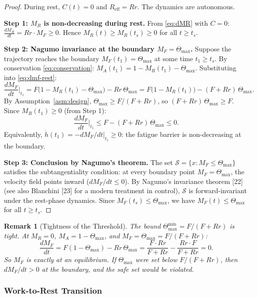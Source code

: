 \documentclass[11pt,a4paper]{article}
\newtheorem{remark}[theorem]{Remark}
\begin{document}
\begin{proof}
During rest, $C(t) = 0$ and $R_{\mathrm{eff}} = Rr$. The dynamics are
autonomous.

\textbf{Step 1: $M_R$ is non-decreasing during rest.} From
\eqref{eq:dMR} with $C = 0$:
$\frac{dM_R}{dt} = Rr \cdot M_F \geq 0$.
Hence $M_R(t) \geq M_R(t_s) \geq 0$ for all $t \geq t_s$.

\textbf{Step 2: Nagumo invariance at the boundary $M_F = \Theta_{\max}$.}
Suppose the trajectory reaches the boundary $M_F(t_1) = \Theta_{\max}$ at some
time $t_1 \geq t_s$. By conservation \eqref{eq:conservation}:
$M_A(t_1) = 1 - M_R(t_1) - \Theta_{\max}$.
Substituting into \eqref{eq:dmf-rest}:
\begin{equation}
\frac{dM_F}{dt}\bigg|_{t_1} = F\bigl(1 - M_R(t_1) - \Theta_{\max}\bigr) - Rr\,\Theta_{\max} = F\bigl(1 - M_R(t_1)\bigr) - (F + Rr)\,\Theta_{\max}.
\end{equation}
By Assumption~\ref{asm:design}, $\Theta_{\max} \geq F/(F + Rr)$, so
$(F + Rr)\,\Theta_{\max} \geq F$. Since $M_R(t_1) \geq 0$ (from Step 1):
\[
\frac{dM_F}{dt}\bigg|_{t_1} \leq F - (F + Rr)\,\Theta_{\max} \leq 0.
\]
Equivalently, $\dot h(t_1) = -dM_F/dt|_{t_1} \geq 0$: the fatigue
barrier is non-decreasing at the boundary.

\textbf{Step 3: Conclusion by Nagumo's theorem.} The set $\mathcal{S}
= \{x : M_F \leq \Theta_{\max}\}$ satisfies the subtangentiality
condition: at every boundary point $M_F = \Theta_{\max}$, the velocity
field points inward ($dM_F/dt \leq 0$). By Nagumo's invariance
theorem [22] (see also Blanchini [23] for a modern treatment in
control), $\mathcal{S}$ is forward-invariant under the rest-phase
dynamics. Since $M_F(t_s) \leq \Theta_{\max}$, we have $M_F(t) \leq
\Theta_{\max}$ for all $t \geq t_s$.
\end{proof}

\begin{remark}[Tightness of the Threshold]
The bound $\Theta_{\max}^{\min} = F/(F+Rr)$ is tight. At $M_R = 0$,
$M_A = 1 - \Theta_{\max}$, and $M_F = \Theta_{\max} = F/(F+Rr)$:
\[
\frac{dM_F}{dt} = F(1 - \Theta_{\max}) - Rr\,\Theta_{\max} =
\frac{F \cdot Rr}{F + Rr} - \frac{Rr \cdot F}{F + Rr} = 0.
\]
So $M_F$ is exactly at an equilibrium. If $\Theta_{\max}$ were set
below $F/(F+Rr)$, then $dM_F/dt > 0$ at the boundary, and the safe
set would be violated.
\end{remark}

\subsubsection{Work-to-Rest Transition}
\end{document}
